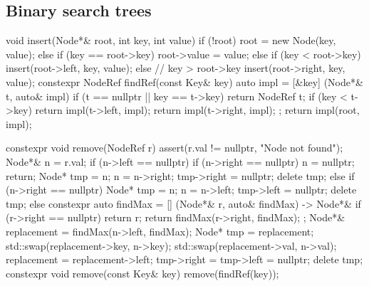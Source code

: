 \documentclass[11pt,a4paper]{report}
\begin{document}
\subsection*{Binary search trees}
\begin{cpp}
void insert(Node*& root, int key, int value) {
  if (!root) 
    root = new Node(key, value);
  else if (key == root->key)
    root->value = value;
  else if (key < root->key)
    insert(root->left, key, value);
  else  // key > root->key
    insert(root->right, key, value);
  }
constexpr NodeRef findRef(const Key& key) {
    auto impl = [&key] (Node*& t, auto& impl) {
                    if (t == nullptr || key == t->key) return NodeRef { t};
                    if (key < t->key) return impl(t->left, impl);
                    return impl(t->right, impl);
                };
    return impl(root, impl);
}

constexpr void remove(NodeRef r) {
    assert(r.val != nullptr, "Node not found");
    Node*& n = r.val;
    if (n->left == nullptr) {
        if (n->right == nullptr) { n = nullptr; return; }
        Node* tmp = n;
        n = n->right;
        tmp->right = nullptr;
        delete tmp;
    } else if (n->right == nullptr) {
        Node* tmp = n;
        n = n->left;
        tmp->left = nullptr;
        delete tmp;
    } else {
        constexpr auto findMax = [] (Node*& r, auto& findMax) -> Node*& {
                           if (r->right == nullptr) return r;
                           return findMax(r->right, findMax);
                       };
        Node*& replacement = findMax(n->left, findMax);
        Node* tmp = replacement;
        std::swap(replacement->key, n->key);
        std::swap(replacement->val, n->val);
        replacement = replacement->left;
        tmp->right = tmp->left = nullptr;
        delete tmp;
    }
}
constexpr void remove(const Key& key) { remove(findRef(key)); }

\end{cpp}
\end{document}
